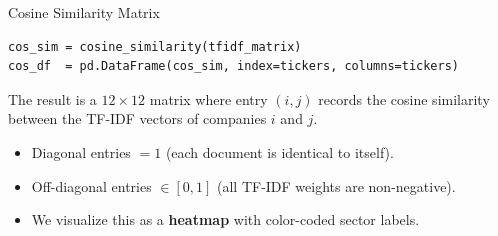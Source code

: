 \documentclass[aspectratio=169,11pt]{beamer}
\begin{document}
\begin{frame}[fragile]{Cosine Similarity Matrix}

\begin{lstlisting}
cos_sim = cosine_similarity(tfidf_matrix)
cos_df  = pd.DataFrame(cos_sim, index=tickers, columns=tickers)
\end{lstlisting}

\vspace{6pt}
The result is a $12 \times 12$ matrix where entry $(i,j)$
records the cosine similarity between the TF-IDF vectors
of companies $i$ and $j$.

\vspace{6pt}
\begin{itemize}
  \item Diagonal entries $= 1$ (each document is identical
        to itself).
  \item Off-diagonal entries $\in [0,1]$ (all TF-IDF weights
        are non-negative).
  \item We visualize this as a \textbf{heatmap} with
        color-coded sector labels.
\end{itemize}

\end{frame}
\end{document}
